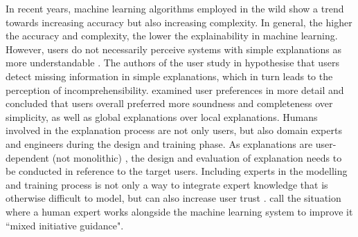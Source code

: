 In recent years, machine learning algorithms employed in the wild show a trend towards increasing accuracy but also increasing complexity. In general, the higher the accuracy and complexity, the lower the explainability \cite{chen2018learning, richardson2018survey} in machine learning. However, users do not necessarily perceive systems with simple explanations as more understandable \cite{allahyari2011user}. The authors of the user study in \cite{allahyari2011user} hypothesise that users detect missing information in simple explanations, which in turn leads to the perception of incomprehensibility. \cite{van2018contrastive} examined user preferences in more detail and concluded that users overall preferred more soundness and completeness over simplicity, as well as global explanations over local explanations.\newline
Humans involved in the explanation process are not only users, but also domain experts and engineers during the design and training phase. As explanations are user-dependent (not monolithic) \cite{preece2018asking}, the design and evaluation of explanation needs to be conducted in reference to the target users. Including experts in the modelling and training process is not only a way to integrate expert knowledge that is otherwise difficult to model, but can also increase user trust \cite{ventocilla2018taxonomy}. \cite{liu2017towards} call the situation where a human expert works alongside the machine learning system to improve it ``mixed initiative guidance". \newline

